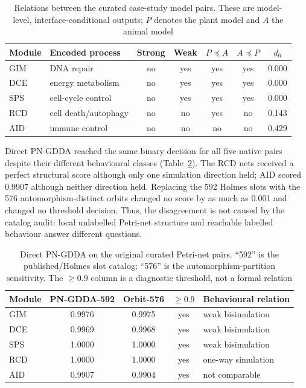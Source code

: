 \documentclass[JMCS,submit]{resources/ISRP}
\theoremstyle{definition}
\theoremstyle{remark}
\numberwithin{equation}{section}
\begin{document}
\begin{table}[t]
\caption{Relations between the curated case-study model pairs. These are
model-level, interface-conditional outputs; $P$ denotes the plant model and
$A$ the animal model}\label{tab:case}
\centering
\small
\begin{tabular*}{\textwidth}{@{\extracolsep\fill}llccccc}
\toprule
Module & Encoded process & Strong & Weak & $P\preceq A$ & $A\preceq P$ & $d_6$ \\
\midrule
GIM & DNA repair & no & yes & yes & yes & 0.000 \\
DCE & energy metabolism & no & yes & yes & yes & 0.000 \\
SPS & cell-cycle control & no & yes & yes & yes & 0.000 \\
RCD & cell death/autophagy & no & no & yes & no & 0.143 \\
AID & immune control & no & no & no & no & 0.429 \\
\bottomrule
\end{tabular*}
\end{table}

Direct PN-GDDA reached the same binary decision for all five native pairs despite
their different behavioural classes (Table~\ref{tab:pn-gdda-native}). The RCD
nets received a perfect structural score although only one simulation direction
held; AID scored 0.9907 although neither direction held. Replacing the 592 Holmes
slots with the 576 automorphism-distinct orbits changed no score by as much as
0.001 and changed no threshold decision. Thus, the disagreement is not caused by
the catalog audit: local unlabelled Petri-net structure and reachable labelled
behaviour answer different questions.

\begin{table}[t]
\caption{Direct PN-GDDA on the original curated Petri-net pairs. ``592'' is the
published/Holmes slot catalog; ``576'' is the automorphism-partition sensitivity.
The $\geq0.9$ column is a diagnostic threshold, not a formal relation}
\label{tab:pn-gdda-native}
\centering
\small
\begin{tabular*}{\textwidth}{@{\extracolsep\fill}lcccl}
\toprule
Module & PN-GDDA-592 & Orbit-576 & $\geq0.9$ & Behavioural relation \\
\midrule
GIM & 0.9976 & 0.9975 & yes & weak bisimulation \\
DCE & 0.9969 & 0.9968 & yes & weak bisimulation \\
SPS & 1.0000 & 1.0000 & yes & weak bisimulation \\
RCD & 1.0000 & 1.0000 & yes & one-way simulation \\
AID & 0.9907 & 0.9904 & yes & not comparable \\
\bottomrule
\end{tabular*}
\end{table}
\end{document}
